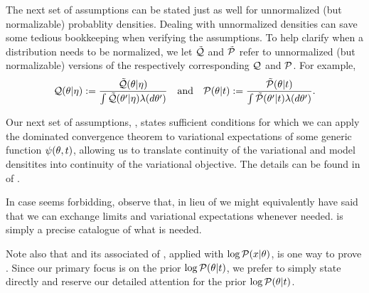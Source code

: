 The next set of assumptions can be stated just as well for unnormalized (but
normalizable) probablity densities.  Dealing with unnormalized densities can
save some tedious bookkeeping when verifying the assumptions.  To help clarify
when a distribution needs to be normalized, we let $\tilde{\mathcal{Q}}$ and $\tilde{\mathcal{P}}$ refer to
unnormalized (but normalizable) versions of the respectively corresponding $\mathcal{Q}$
and $\mathcal{P}$.  For example,
%
\begin{align*}
%
\q(\theta \vert \eta) :={}
    \frac{\qtil(\theta \vert \eta)}
    {\int \qtil(\theta' \vert \eta) \lambda(d\theta')} \mathand
\p(\theta \vert \t) :={}
    \frac{\ptil(\theta \vert \t)}
    {\int \ptil(\theta' \vert \t) \lambda(d\theta')}.
%
\end{align*}
%


Our next set of assumptions, , states sufficient
conditions for which we can apply the dominated convergence theorem to
variational expectations of some generic function $\psi(\theta, t)$, allowing
us to translate continuity of the variational and model densitites into
continuity of the variational objective.  The details can be found in
 of .

In case  seems forbidding, observe that, in lieu of
 we might equivalently have said that we can exchange
limits and variational expectations whenever needed.   is
simply a precise catalogue of what is needed.

Note also that  and its associated  of , applied with $\log \mathcal{P}(x \vert \theta)$,
is one way to prove .  Since our primary
focus is on the prior $\log \mathcal{P}(\theta \vert t)$, we prefer to simply state
 directly and reserve our detailed attention
for the prior $\log \mathcal{P}(\theta \vert t)$.


